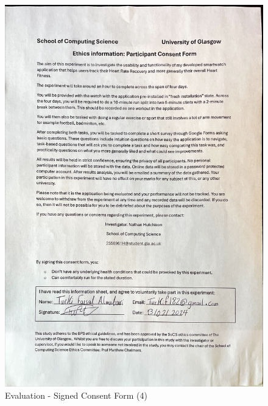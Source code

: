 \documentclass{l4proj}
\begin{document}
\begin{figure}[h!]
    \centering
    \includegraphics[width=1\linewidth]{dissertation//dissImages/Consent4.jpg}
    \caption{Evaluation - Signed Consent Form (4)}
\end{figure}
\end{document}
